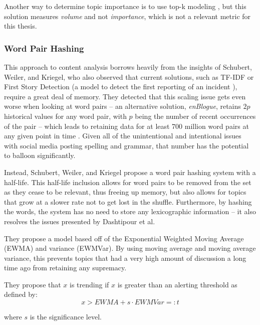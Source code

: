 \documentclass[preprint,review,12pt]{elsarticle}
\begin{document}
Another way to determine topic importance is to use top-k modeling \cite{babcock2003distributed}, but this solution measures \textit{volume} and not \textit{importance}, which is not a relevant metric for this thesis. 

\subsubsection{Word Pair Hashing}
This approach to content analysis borrows heavily from the insights of Schubert, Weiler, and Kriegel, who also observed that current solutions, such as TF-IDF or First Story Detection (a model to detect the first reporting of an incident \cite{petrovic2010streaming,yang1998study}), require a great deal of memory. They detected that this scaling issue gets even worse when looking at word pairs -- an alternative solution, \textit{enBlogue}, retains $2p$ historical values for any word pair, with $p$ being the number of recent occurrences of the pair \cite{alvanaki2012see} -- which leads to retaining data for at least 700 million word pairs at any given point in time \cite{schubert2014signitrend}. Given all of the unintentional and intentional issues with social media posting spelling and grammar, that number has the potential to balloon significantly. 

Instead, Schubert, Weiler, and Kriegel propose a word pair hashing system with a half-life. This half-life inclusion allows for word pairs to be removed from the set as they cease to be relevant, thus freeing up memory, but also allows for topics that grow at a slower rate not to get lost in the shuffle. Furthermore, by hashing the words, the system has no need to store any lexicographic information -- it also resolves the issues presented by Dashtipour et al.

They propose a model based off of the Exponential Weighted Moving Average (EWMA) and variance (EWMVar). By using moving average and moving average variance, this prevents topics that had a very high amount of discussion a long time ago from retaining any supremacy. 

They propose that $x$ is trending if $x$ is greater than an alerting threshold as defined by:
\begin{equation}
    \label{trending}
    x >EWMA + s \cdot EWMVar =: t
\end{equation}
 
where $s$ is the significance level. 
\end{document}
